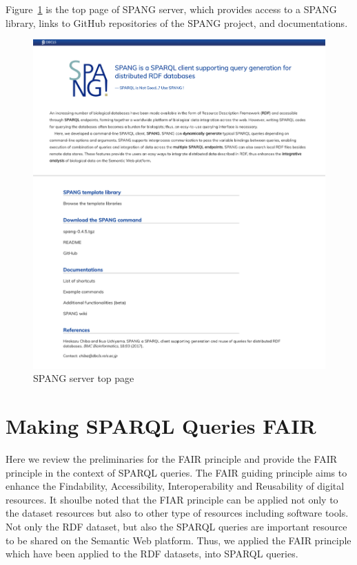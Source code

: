 \documentclass[runningheads]{llncs}
\begin{document}
Figure~\ref{fig:spang_top} is the top page of SPANG server, which provides access to a SPANG library, links to GitHub repositories of the SPANG project, and documentations.


\begin{figure}
\center
\includegraphics[width=1.0\textwidth]{spang_top.png}
\caption{SPANG server top page}
\label{fig:spang_top}
\end{figure}


\section{Making SPARQL Queries FAIR}

Here we review the preliminaries for the FAIR principle
and provide the FAIR principle in the context of SPARQL queries.
The FAIR guiding principle aims to enhance the Findability, Accessibility, Interoperability and Reusability of digital resources.
It shoulbe noted that the FIAR principle can be applied not only to the dataset resources but also to other type of resources including software tools.
Not only the RDF dataset, but also the SPARQL queries are important resource to be shared on the Semantic Web platform. Thus, we applied the FAIR principle which have been applied to the RDF datasets, into SPARQL queries.
\end{document}
